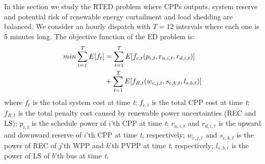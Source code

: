 In this section we study the RTED problem where CPPs outputs, system reserve and potential risk of {renewable energy curtailment} and {load shedding} are balanced. We consider an hourly dispatch with $T=12$ intervals where each one is 5 minutes long. The objective function of the ED problem is:
%
%
\begin{equation} \label{DB_1}
\begin{aligned}
\begin{aligned}
min\sum _{{\it t}={\it 1}}^{{\it T}}E[f_t]& =\sum _{{\it t}=1}^{{\it T}}E[f_{c,t}(p_{i,t},r_{u,i,t},r_{d,i,t})]\\
& +\sum _{{\it t}=1}^{{\it T}}E[f_{R,t}(w_{c,j,t},s_{c,k,t},l_{s,b,t})]\\
\end{aligned}
\end{aligned}
\end{equation}
where $f_t$  is the total system cost at time {\it t};
$f_{c,t}$ is the total CPP cost at time {\it t}; $f_{R,t}$ is the total penalty cost caused by renewable power uncertainties (REC and LS); $p_{i,t}$ is the schedule power of $i$'th CPP at time {\it t}; $r_{u,i,t}$ and $r_{d,i,t}$ is the upward and downward reserve of $i$'th CPP at time {\it t}, respectively; $w_{c,j,t}$ and $s_{c,k,t}$ is the power of REC of $j$'th WPP and $k$'th PVPP at time {\it t}, respectively; $l_{s,b,t}$ is the power of LS of $b$'th bus at time {\it t}.

